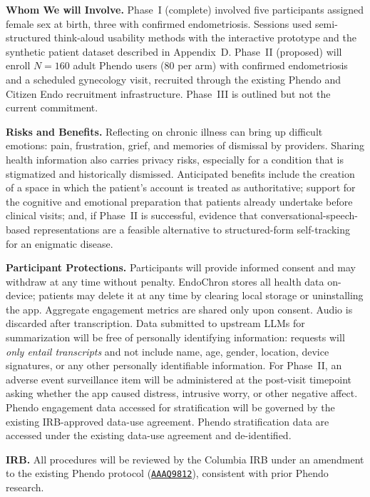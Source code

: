 \textbf{Whom We will Involve.} Phase~I (complete) involved five participants assigned female sex at birth, three with confirmed endometriosis. Sessions used semi-structured think-aloud usability methods with the interactive prototype and the synthetic patient dataset described in Appendix~D. Phase~II (proposed) will enroll $N=160$ adult Phendo users (80 per arm) with confirmed endometriosis and a scheduled gynecology visit, recruited through the existing Phendo and Citizen Endo recruitment infrastructure. Phase~III is outlined but not the current commitment.

\textbf{Risks and Benefits.} Reflecting on chronic illness can bring up difficult emotions: pain, frustration, grief, and memories of dismissal by providers. Sharing health information also carries privacy risks, especially for a condition that is stigmatized and historically dismissed. Anticipated benefits include the creation of a space in which the patient's account is treated as authoritative; support for the cognitive and emotional preparation that patients already undertake before clinical visits; and, if Phase~II is successful, evidence that conversational-speech-based representations are a feasible alternative to structured-form self-tracking for an enigmatic disease.

\textbf{Participant Protections.} Participants will provide informed consent and may withdraw at any time without penalty. EndoChron stores all health data on-device; patients may delete it at any time by clearing local storage or uninstalling the app. Aggregate engagement metrics are shared only upon consent. Audio is discarded after transcription. Data submitted to upstream LLMs for summarization will be free of personally identifying information: requests will \textit{only entail transcripts} and not include name, age, gender, location, device signatures, or any other personally identifiable information. For Phase~II, an adverse event surveillance item will be administered at the post-visit timepoint asking whether the app caused distress, intrusive worry, or other negative affect. Phendo engagement data accessed for stratification will be governed by the existing IRB-approved data-use agreement. Phendo stratification data are accessed under the existing data-use agreement and de-identified.

\textbf{IRB.} All procedures will be reviewed by the Columbia IRB under an amendment to the existing Phendo protocol (\href{https://pmc.ncbi.nlm.nih.gov/articles/PMC7314826/}{\texttt{AAAQ9812}}), consistent with prior Phendo research.

